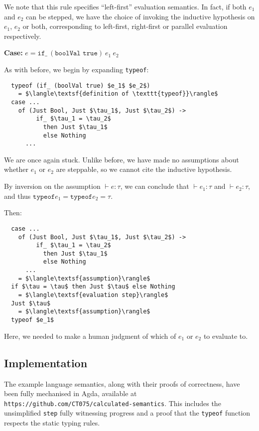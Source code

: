 \documentclass[manuscript,screen,review,sigplan]{acmart}
\begin{document}
We note that this rule specifies ``left-first'' evaluation semantics. In fact,
if both $e_1$ and $e_2$ can be stepped, we have the choice of invoking the
inductive hypothesis on $e_1$, $e_2$ or both, corresponding to left-first,
right-first or parallel evaluation respectively.

\hfill

\textbf{Case:} $e = \texttt{if\_}\ (\texttt{boolVal true})\ e_1\ e_2$

\hfill

As with before, we begin by expanding \texttt{typeof}:

\begin{lstlisting}
  typeof (if_ (boolVal true) $e_1$ $e_2$)
    = $\langle\textsf{definition of \texttt{typeof}}\rangle$
  case ...
    of (Just Bool, Just $\tau_1$, Just $\tau_2$) ->
         if_ $\tau_1 = \tau_2$
           then Just $\tau_1$
           else Nothing
      ...
\end{lstlisting}

We are once again stuck. Unlike before, we have made no assumptions about
whether $e_1$ or $e_2$ are steppable, so we cannot cite the inductive
hypothesis.

By inversion on the assumption $\vdash e : \tau$, we
can conclude that $\vdash e_1 : \tau$ and $\vdash e_2: \tau$, and thus
$\texttt{typeof} e_1 = \texttt{typeof} e_2 = \tau$.

Then:

\begin{lstlisting}
  case ...
    of (Just Bool, Just $\tau_1$, Just $\tau_2$) ->
         if_ $\tau_1 = \tau_2$
           then Just $\tau_1$
           else Nothing
      ...
    = $\langle\textsf{assumption}\rangle$
  if $\tau = \tau$ then Just $\tau$ else Nothing
    = $\langle\textsf{evaluation step}\rangle$
  Just $\tau$
    = $\langle\textsf{assumption}\rangle$
  typeof $e_1$
\end{lstlisting}

Here, we needed to make a human judgment of which of $e_1$ or $e_2$ to evaluate
to.

\subsection{Implementation}

The example language semantics, along with their proofs of correctness, have
been fully mechanised in Agda, available at \texttt{https://github.com/CT075/calculated-semantics}.
This includes the unsimplified \texttt{step} fully witnessing progress and a
proof that the \texttt{typeof} function respects the static typing rules.
\end{document}

